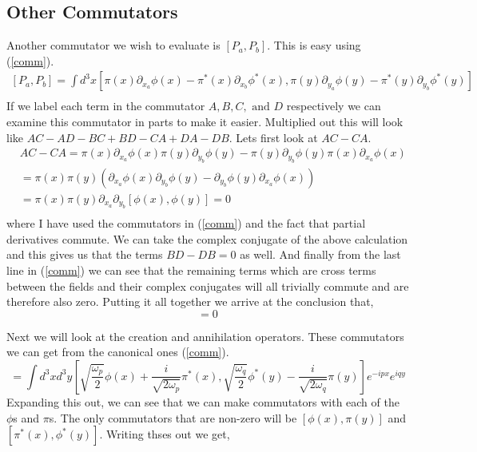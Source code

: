 \documentclass{article}
\numberwithin{equation}{section}
\newcommand{\dxa}{\partial_{x_a}}
\newcommand{\dya}{\partial_{y_a}}
\newcommand{\dxb}{\partial_{x_b}}
\newcommand{\dyb}{\partial_{y_b}}
\newcommand{\beq}{\begin{equation}}
\newcommand{\eeq}{\end{equation}}
\begin{document}
\subsection{Other Commutators}

Another commutator we wish to evaluate is $[P_a, P_b]$. This is easy using (\ref{comm}).
\beq \begin{split}
    [P_a,P_b] = \int d^3x[\pi(x)\dxa\phi(x) - \pi^*(x)\dxb\phi^*(x), \pi(y)\dya\phi(y) - \pi^*(y)\dyb\phi^*(y)] \\
\end{split} \eeq
If we label each term in the commutator $A,B,C,\text{ and }D$ respectively we can examine this commutator in parts to make it easier. Multiplied out this will look like
$AC-AD-BC+BD-CA+DA-DB$. Lets first look at $AC-CA$.
\beq \begin{split}
    &AC-CA = \pi(x)\dxa\phi(x)\pi(y)\dyb\phi(y) - \pi(y)\dyb\phi(y)\pi(x)\dxa\phi(x) \\
    &= \pi(x)\pi(y) \left( \dxa\phi(x)\dyb\phi(y) - \dyb\phi(y)\dxa\phi(x) \right) \\
    & = \pi(x)\pi(y) \dxa\dyb[\phi(x),\phi(y)] = 0 \\
\end{split} \eeq
where I have used the commutators in (\ref{comm}) and the fact that partial derivatives commute. We can take the complex conjugate of the above calculation and this gives us that the terms $BD-DB=0$ as well. And finally from the last line in (\ref{comm}) we can see that the remaining terms which are cross terms between the fields and their 
complex conjugates will all trivially commute and are therefore also zero. Putting it all together we arrive at the conclusion that,
\beq
    [P_a,P_b] = 0
\eeq

Next we will look at the creation and annihilation operators. These commutators we can get from the canonical ones (\ref{comm}).
\newcommand{\ttop}[1]{\sqrt{\frac{\omega_{#1}}{2}}}
\newcommand{\bbot}[1]{\frac{i}{\sqrt{2\omega_{#1}}}}
\beq 
    [\hat{a}_p, \hat{a}^\dagger_q] = \int d^3x d^3y \left[\ttop{p}\phi(x) + \bbot{p} \pi^*(x), \ttop{q}\phi^*(y) - \bbot{q}\pi(y)\right]e^{-ipx}e^{iqy}
\eeq
Expanding this out, we can see that we can make commutators with each of the $\phi$s and $\pi$s. The only commutators that are non-zero will be $[\phi(x),\pi(y)]$ and $[\pi^*(x),\phi^*(y)]$. Writing thses out we get,
\end{document}
